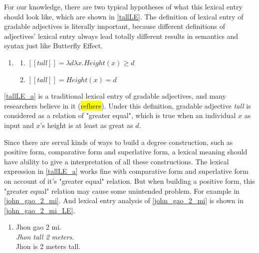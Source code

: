 \documentclass{ctexart}
\begin{document}
For our knowledge, there are two typical hypotheses of what this lexical entry should look like, which are shown in \ref{tallLE}. The definition of lexical entry of gradable adjectives is literally important, because different definitions of adjectives' lexical entry always lead totally different results in semantics and syntax just like Butterfly Effect.

\begin{enumerate}[resume]
    \item \label{tallLE}
    
    \begin{enumerate}[ref=(\arabic{enumi}\alph*)]
    \item \label{tallLE_a} 
    $[\![tall]\!]=\lambda d \lambda x.Height(x) \geq d$
    
    \item \label{tallLE_b} 
    $[\![tall]\!]=Height(x)=d$
    
    \end{enumerate}
\end{enumerate}

\ref{tallLE_a} is a traditional lexical entry of gradable adjectives, and many researchers believe in it (\colorbox{yellow}{refhere}). Under this definition, gradable adjective \textit{tall} is considered as a relation of "greater equal", which is true when an individual $x$ as input and $x$'s height is at least as great as $d$.

Since there are serval kinds of ways to build a degree construction, such as positive form, comparative form and superlative form, a lexical meaning should have ability to give a interpretation of all these constructions. The lexical expression in \ref{tallLE_a} works fine with comparative form and superlative form on account of it's "greater equal" relation. But when building a positive form, this "greater equal" relation may cause some unintended problem. For example in \ref{john_gao_2_mi}. And lexical entry analysis of \ref{john_gao_2_mi} is shown in \ref{john_gao_2_mi_LE}.

\begin{enumerate}[resume]
    \item \label{john_gao_2_mi}
    Jhon gao 2 mi.  \\
    \textit{Jhon tall 2 meters.}    \\
    Jhon is 2 meters tall.
    
\end{enumerate}
\end{document}
